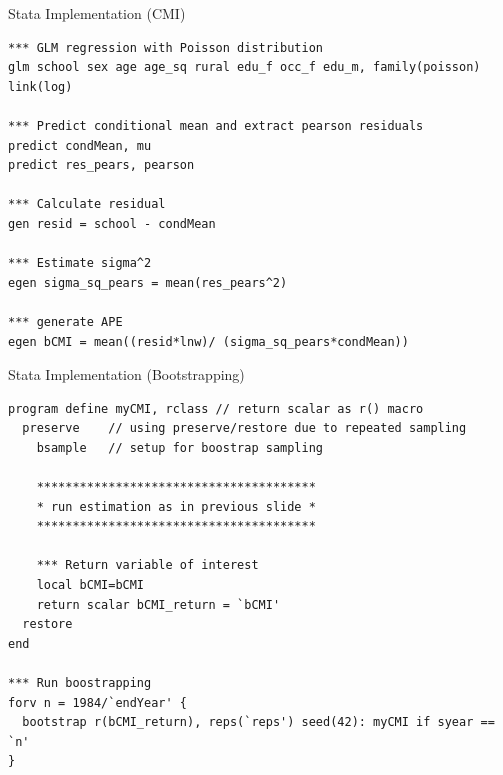 \documentclass[10pt,ignorenonframetext,]{beamer}
\begin{document}
\begin{frame}[fragile]{Stata Implementation (CMI)}
\protect\hypertarget{stata-implementation-cmi}{}

\footnotesize

\begin{verbatim}
*** GLM regression with Poisson distribution
glm school sex age age_sq rural edu_f occ_f edu_m, family(poisson) link(log)
    
*** Predict conditional mean and extract pearson residuals
predict condMean, mu
predict res_pears, pearson

*** Calculate residual
gen resid = school - condMean

*** Estimate sigma^2
egen sigma_sq_pears = mean(res_pears^2)

*** generate APE
egen bCMI = mean((resid*lnw)/ (sigma_sq_pears*condMean))
\end{verbatim}

\normalsize

\end{frame}

\begin{frame}[fragile]{Stata Implementation (Bootstrapping)}
\protect\hypertarget{stata-implementation-bootstrapping}{}

\footnotesize

\begin{verbatim}
program define myCMI, rclass // return scalar as r() macro
  preserve    // using preserve/restore due to repeated sampling 
    bsample   // setup for boostrap sampling 
    
    ***************************************
    * run estimation as in previous slide *
    ***************************************
    
    *** Return variable of interest
    local bCMI=bCMI 
    return scalar bCMI_return = `bCMI'
  restore
end

*** Run boostrapping
forv n = 1984/`endYear' {
  bootstrap r(bCMI_return), reps(`reps') seed(42): myCMI if syear == `n'
}
\end{verbatim}

\normalsize

\end{frame}
\end{document}
